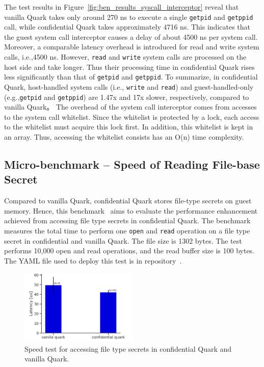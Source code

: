 The test results in Figure~\ref{fig:ben_results_syscall_interceptor} reveal that vanilla Quark takes only around 270 ns to execute a single \texttt{getpid} and \texttt{getppid} call, while confidential Quark takes approximately 4716 ns. This indicates that the guest system call interceptor causes a delay of about 4500 ns per system call. Moreover, a 
comparable latency overhead is introduced for read and write system calls, i.e.,4500 ns. However, \texttt{read} and \texttt{write} system calls are processed on the host side and take longer. Thus their processing time in confidential Quark rises less significantly than that of \texttt{getpid} and \texttt{getppid}. To summarize, in 
confidential Quark, host-handled system calls (i.e., \texttt{write} and \texttt{read}) and guest-handled-only (e.g.,\texttt{getpid} and \texttt{getppid}) are 1.47x and 17x slower, respectively, compared to vanilla Quark。 The overhead of the system call interceptor comes from accesses to the system call whitelist. Since the whitelist is 
protected by a lock, each access to the whitelist must acquire this lock first. In addition, this whitelist is kept in an array. Thus, accessing the whitelist consists has an O(n) time complexity.

\subsection{Micro-benchmark – Speed of Reading File-base Secret}
\label{bench_reading_file_secret}

Compared to vanilla Quark, confidential Quark stores file-type secrets on guest memory. Hence, this benchmark~\cite*{benchamark_filebase_secret} aims to evaluate the performance enhancement achieved from accessing file type secrets in confidential Quark. 
The benchmark measures the total time to perform one \texttt{open} and \texttt{read} operation on a file type secret in confidential and vanilla Quark. The file size is 1302 bytes. The test performs 10,000 open and read operations, and the read buffer size is 100 bytes. The YAML file used to deploy this test 
is in repository~\cite*{perf_test_repo}.

\begin{figure}[!htb]
    \centering
    \includegraphics[width=0.5\textwidth]{images/reading_speed_of_file_type_secrets_in_Baseline_and_Cquark.PNG}
    \caption[Speed test for accessing file type secrets in confidential Quark and vanilla Quark]{Speed test for accessing file type secrets in confidential Quark and vanilla Quark.}
    \label{fig:reading_speed_of_file_type_secrets_in_Baseline_and_Cquark}
\end{figure}


